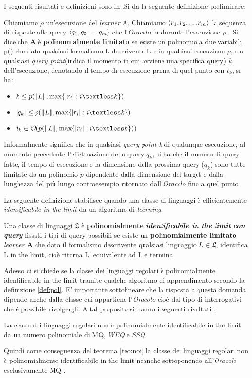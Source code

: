 I seguenti risultati e definizioni sono in \cite{Angluin90}.Si da la seguente definizione preliminare:
\begin{definizione}
Chiamiamo $\rho$ un'esecuzione del \textit{learner} A. Chiamiamo $\Braket{r_1,r_2,\dots r_m}$ la sequenza di risposte alle query $\Braket{q_1,q_2,\dots q_m}$ che l'\textit{Oracolo} fa durante l'esecuzione $\rho$ . Si dice che \textbf{A} è \textbf{polinomialmente  limitato} se esiste un polinomio a due variabili p() che dato qualsiasi formalismo L descrivente  \ac{L} e in qualsiasi esecuzione $\rho$, e a qualsiasi \textit{query point}(indica il momento in cui avviene una specifica query) $k$ dell'esecuzione, denotando il tempo di esecuzione prima di quel punto con $t_k$, si ha:
\begin{itemize}
\item $k \le p(\norma{L} , \text{max}\{\abs{r_i} : i \textless k \})$
\item $\abs{q_k} \le p(\norma{L} , \text{max}\{\abs{r_i} : i \textless k \})$
\item $t_k \in \mathcal{O}(p(\norma{L} , \text{max}\{\abs{r_i} : i \textless k \}))$
\end{itemize}
\end{definizione}
Informalmente significa che in qualsiasi \textit{query point k} di qualunque esecuzione, al momento precedente l'effettuazione della query $q_k$, si ha che il numero di query fatte, il tempo di esecuzione e la dimensione della prossima query ($q_k$) sono tutte limitate da un polinomio $p$ dipendente dalla dimensione del target e dalla lunghezza del più lungo controesempio ritornato dall'\textit{Oracolo} fino a quel punto
   
La seguente definizione stabilisce quando una classe di linguaggi è efficientemente \textit{identificabile in the limit} da un algoritmo di  \textit{learning}. 
\begin{definizione}
\label{def:pol}
Una classe di linguaggi $\mathfrak{L}$ è \textbf{polinomialmente \textit{identificabile in the limit con query}} fissati i tipi di query possibili se esiste un \textbf{polinomialmente limitato} \textit{learner} \textbf{A} che dato il formalismo descrivente qualsiasi linguaggio $L \in  \mathfrak{L}$, identifica L in the limit, cioè ritorna  L' equivalente ad L e termina.
\end{definizione}

Adesso ci si chiede se la classe dei linguaggi regolari è polinomialmente identificabile in the limit tramite qualche algoritmo di apprendimento secondo la definizione \ref{def:pol}. E' importante sottolineare che la risposta a questa domanda dipende anche dalla classe cui appartiene l'\textit{Oracolo} cioè dal tipo di interrogativi che è possibile rivolgergli.  A tal proposito si hanno i seguenti risultati :
\begin{teorema}
\label{teo:noi}
La classe dei linguaggi regolari  non è polinomialmente identificabile in the limit da un numero polinomiale di \ac{MQ}, \textit{WEQ} e \textit{SSQ}
\end{teorema}
Quindi come conseguenza del teorema \ref{teo:noi}   la classe dei linguaggi regolari non è polinomialmente identificabile in the limit  neanche sottoponendo all'\textit{Oracolo} esclusivamente \ac{MQ} .

